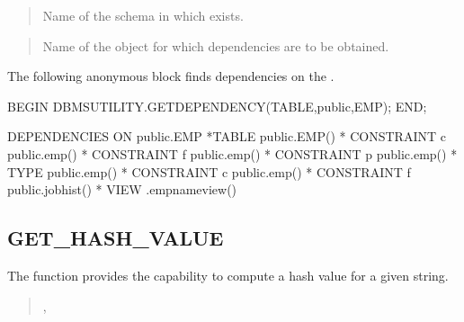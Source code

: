 \documentclass[letterpaper,10pt,english,openany,oneside]{sphinxmanual}
\begin{document}
\begin{quote}

Name of the schema in which  exists.
\end{quote}

\begin{quote}

Name of the object for which dependencies are to be obtained.
\end{quote}


The following anonymous block finds dependencies on the .

%
\begin{sphinxVerbatim}[commandchars=\\\{\}]
BEGIN
    DBMS\PYGZus{}UTILITY.GET\PYGZus{}DEPENDENCY(\PYGZsq{}TABLE\PYGZsq{},\PYGZsq{}public\PYGZsq{},\PYGZsq{}EMP\PYGZsq{});
END;

DEPENDENCIES ON public.EMP
\PYGZhy{}\PYGZhy{}\PYGZhy{}\PYGZhy{}\PYGZhy{}\PYGZhy{}\PYGZhy{}\PYGZhy{}\PYGZhy{}\PYGZhy{}\PYGZhy{}\PYGZhy{}\PYGZhy{}\PYGZhy{}\PYGZhy{}\PYGZhy{}\PYGZhy{}\PYGZhy{}\PYGZhy{}\PYGZhy{}\PYGZhy{}\PYGZhy{}\PYGZhy{}\PYGZhy{}\PYGZhy{}\PYGZhy{}\PYGZhy{}\PYGZhy{}\PYGZhy{}\PYGZhy{}\PYGZhy{}\PYGZhy{}\PYGZhy{}\PYGZhy{}\PYGZhy{}\PYGZhy{}\PYGZhy{}\PYGZhy{}\PYGZhy{}\PYGZhy{}\PYGZhy{}\PYGZhy{}\PYGZhy{}\PYGZhy{}\PYGZhy{}\PYGZhy{}\PYGZhy{}\PYGZhy{}\PYGZhy{}\PYGZhy{}\PYGZhy{}\PYGZhy{}\PYGZhy{}\PYGZhy{}\PYGZhy{}\PYGZhy{}\PYGZhy{}\PYGZhy{}\PYGZhy{}\PYGZhy{}\PYGZhy{}\PYGZhy{}\PYGZhy{}\PYGZhy{}\PYGZhy{}\PYGZhy{}
*TABLE public.EMP()
*   CONSTRAINT c public.emp()
*   CONSTRAINT f public.emp()
*   CONSTRAINT p public.emp()
*   TYPE public.emp()
*   CONSTRAINT c public.emp()
*   CONSTRAINT f public.jobhist()
*   VIEW .empname\PYGZus{}view()
\end{sphinxVerbatim}

\newpage


\subsection{GET\_HASH\_VALUE}
\label{\detokenize{dbms_utility:get-hash-value}}
The  function provides the capability to compute a hash value for a given string.
\begin{quote}

,
\begin{quote}

\end{quote}
\end{quote}
\end{document}
